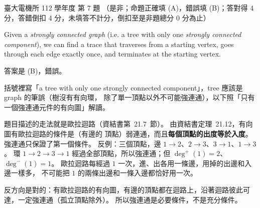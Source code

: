 \begin{pastexam}[label={px:ntu-112-ee-ds-07}]{臺大電機所 112 學年度 第 7 題}
（是非；命題正確填 (A)，錯誤填 (B)；答對得 4 分，答錯倒扣 4 分，未填答不計分，倒扣至是非題總分 0 分為止）

Given a \textit{strongly connected graph} (i.e. a tree with only one \textit{strongly connected component}), we can find a trace that traverses from a starting vertex, goes through each edge exactly once, and terminates at the starting vertex.
\end{pastexam}

\begin{pastsoln}
答案是 (B)，錯誤。

括號裡寫「a tree with only one strongly connected component」，tree 應該是 graph 的筆誤（樹沒有有向環，
除了單一頂點以外不可能強連通），以下照「只有一個強連通元件的有向圖」解讀。

題目描述的走法就是歐拉迴路（資結書第~21.7~節）。 由資結書定理~21.12，有向圖有歐拉迴路的條件是（有邊的
頂點）弱連通，而且\textbf{每個頂點的出度等於入度}。 強連通只保證了第一個條件。 反例：三個頂點，邊
$1 \to 2$、$2 \to 3$、$3 \to 1$、$1 \to 3$。 環 $1 \to 2 \to 3 \to 1$ 經過全部頂點，所以強連通；但
$\deg^{+}(1) = 2$、$\deg^{-}(1) = 1$。 歐拉迴路每經過 $1$ 一次，進、出各用一條邊，用掉的出邊和入邊一樣多，
不可能把 $1$ 的兩條出邊和一條入邊都恰好用一次。

反方向是對的：有歐拉迴路的有向圖，有邊的頂點都在迴路上，沿著迴路彼此可達，一定強連通（孤立頂點除外）。
所以強連通是必要條件，不是充分條件。
\end{pastsoln}
